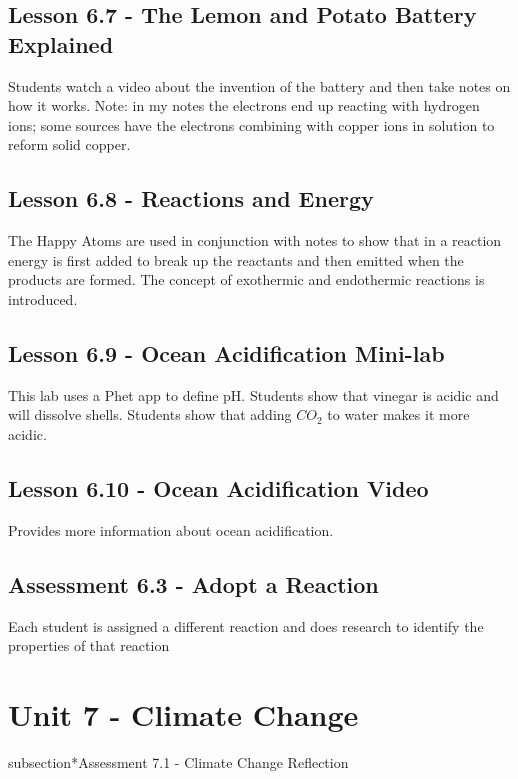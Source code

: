 \documentclass[12pt]{article}
\begin{document}
\subsection{Lesson 6.7 - The Lemon and Potato Battery Explained}

Students watch a video about the invention of the battery and then take notes on how it works. Note: in my notes the electrons end up reacting with hydrogen ions; some sources have the electrons combining with copper ions in solution to reform solid copper.

\subsection{Lesson 6.8 - Reactions and Energy} 

The Happy Atoms are used in conjunction with notes to show that in a reaction energy is first added to break up the reactants and then emitted when the products are formed. The concept of exothermic and endothermic reactions is introduced.

\subsection{Lesson 6.9 - Ocean Acidification Mini-lab}

This lab uses a Phet app to define pH. Students show that vinegar is acidic and will dissolve shells. Students show that adding $CO_2$ to water makes it more acidic.

\subsection{Lesson 6.10 - Ocean Acidification Video}

Provides more information about ocean acidification.

\subsection{Assessment 6.3 - Adopt a Reaction} 

Each student is assigned a different reaction and does research to identify the properties of that reaction

\section{Unit 7 - Climate Change}

subsection*{Assessment 7.1 - Climate Change Reflection} 
\end{document}
